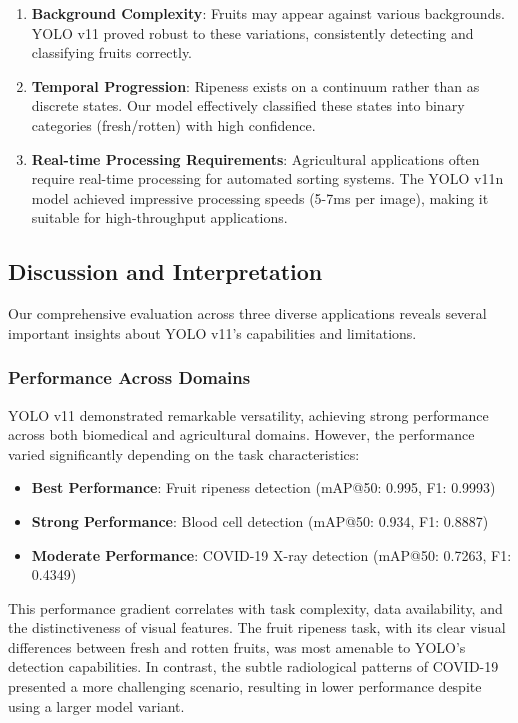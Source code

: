 \begin{multicols}{2}
\begin{enumerate}
    \item \textbf{Background Complexity}: Fruits may appear against various backgrounds. YOLO v11 proved robust to these variations, consistently detecting and classifying fruits correctly.
    
    \item \textbf{Temporal Progression}: Ripeness exists on a continuum rather than as discrete states. Our model effectively classified these states into binary categories (fresh/rotten) with high confidence.
    
    \item \textbf{Real-time Processing Requirements}: Agricultural applications often require real-time processing for automated sorting systems. The YOLO v11n model achieved impressive processing speeds (5-7ms per image), making it suitable for high-throughput applications.
\end{enumerate}

\subsection{Discussion and Interpretation}

Our comprehensive evaluation across three diverse applications reveals several important insights about YOLO v11's capabilities and limitations.

\subsubsection{Performance Across Domains}

YOLO v11 demonstrated remarkable versatility, achieving strong performance across both biomedical and agricultural domains. However, the performance varied significantly depending on the task characteristics:

\begin{itemize}
    \item \textbf{Best Performance}: Fruit ripeness detection (mAP@50: 0.995, F1: 0.9993)
    \item \textbf{Strong Performance}: Blood cell detection (mAP@50: 0.934, F1: 0.8887)
    \item \textbf{Moderate Performance}: COVID-19 X-ray detection (mAP@50: 0.7263, F1: 0.4349)
\end{itemize}

This performance gradient correlates with task complexity, data availability, and the distinctiveness of visual features. The fruit ripeness task, with its clear visual differences between fresh and rotten fruits, was most amenable to YOLO's detection capabilities. In contrast, the subtle radiological patterns of COVID-19 presented a more challenging scenario, resulting in lower performance despite using a larger model variant.


\end{multicols}
